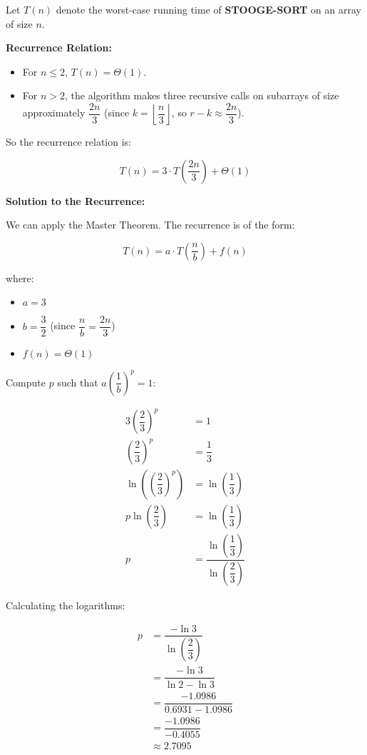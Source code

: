 \documentclass[10pt,letter,notitlepage]{article}
\begin{document}
\begin{Answer}
Let $T(n)$ denote the worst-case running time of \textbf{STOOGE-SORT} on an array of size $n$.

\textbf{Recurrence Relation:}

\begin{itemize}
\item For $n \leq 2$, $T(n) = \Theta(1)$.
\item For $n > 2$, the algorithm makes three recursive calls on subarrays of size approximately $\dfrac{2n}{3}$ (since $k = \left\lfloor \dfrac{n}{3} \right\rfloor$, so $r - k \approx \dfrac{2n}{3}$).
\end{itemize}

So the recurrence relation is:

\[
T(n) = 3 \cdot T\left( \dfrac{2n}{3} \right) + \Theta(1)
\]

\textbf{Solution to the Recurrence:}

We can apply the Master Theorem. The recurrence is of the form:

\[
T(n) = a \cdot T\left( \dfrac{n}{b} \right) + f(n)
\]

where:

\begin{itemize}
\item $a = 3$
\item $b = \dfrac{3}{2}$ (since $\dfrac{n}{b} = \dfrac{2n}{3}$)
\item $f(n) = \Theta(1)$
\end{itemize}

Compute $p$ such that $a \left( \dfrac{1}{b} \right)^p = 1$:

\[
\begin{aligned}
3 \left( \dfrac{2}{3} \right)^p &= 1 \\
\left( \dfrac{2}{3} \right)^p &= \dfrac{1}{3} \\
\ln\left( \left( \dfrac{2}{3} \right)^p \right) &= \ln\left( \dfrac{1}{3} \right) \\
p \ln\left( \dfrac{2}{3} \right) &= \ln\left( \dfrac{1}{3} \right) \\
p &= \dfrac{ \ln\left( \dfrac{1}{3} \right) }{ \ln\left( \dfrac{2}{3} \right) }
\end{aligned}
\]

Calculating the logarithms:

\[
\begin{aligned}
p &= \dfrac{ -\ln 3 }{ \ln \left( \dfrac{2}{3} \right) } \\
&= \dfrac{ -\ln 3 }{ \ln 2 - \ln 3 } \\
&= \dfrac{ -1.0986 }{ 0.6931 - 1.0986 } \\
&= \dfrac{ -1.0986 }{ -0.4055 } \\
&\approx 2.7095
\end{aligned}
\]


\end{Answer}
\end{document}
